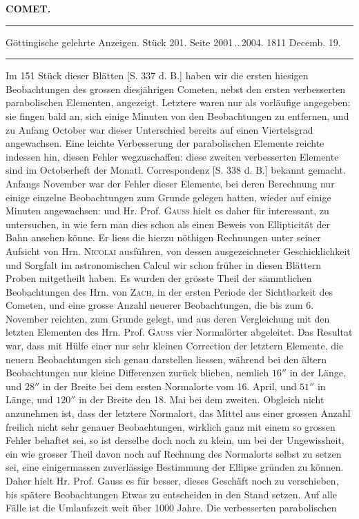 \clearpage{}\hypertarget{native-347-lower}{}\label{native-347-lower}
\begin{center}\textbf{COMET.}\par\vspace{4pt}\hrule\vspace{4pt}\fontsize{10}{12}\selectfont Göttingische gelehrte Anzeigen. Stück 201. Seite 2001\,..\,2004. 1811 Decemb. 19.\par\vspace{4pt}\hrule\vspace{4pt}\end{center}

\par\indent Im 151 Stück dieser Blätten [S. 337 d. B.] haben wir die ersten hiesigen Beobachtungen des grossen diesjährigen Cometen, nebst den ersten verbesserten parabolischen Elementen, angezeigt. Letztere waren nur als vorläufige angegeben; sie fingen bald an, sich einige Minuten von den Beobachtungen zu entfernen, und zu Anfang October war dieser Unterschied bereits auf einen Viertelsgrad angewachsen. Eine leichte Verbesserung der parabolischen Elemente reichte indessen hin, diesen Fehler wegzuschaffen: diese zweiten verbesserten Elemente sind im Octoberheft der Monatl. Correspondenz [S. 338 d. B.] bekannt gemacht. Anfangs November war der Fehler dieser Elemente, bei deren Berechnung nur einige einzelne Beobachtungen zum Grunde gelegen hatten, wieder auf einige Minuten angewachsen: und Hr. Prof. \textsc{Gauss} hielt es daher für interessant, zu untersuchen, in wie fern man dies schon als einen Beweis von Ellipticität der Bahn ansehen könne. Er liess die hierzu nöthigen Rechnungen unter seiner Aufsicht von Hrn. \textsc{Nicolai} ausführen, von dessen ausgezeichneter Geschicklichkeit und Sorgfalt im astronomischen Calcul wir schon früher in diesen Blättern Proben mitgetheilt haben. Es wurden der grösste Theil der sämmtlichen Beobachtungen des Hrn. von \textsc{Zach}, in der ersten Periode der Sichtbarkeit des Cometen, und eine grosse Anzahl neuerer Beobachtungen, die bis zum 6. November reichten, zum Grunde gelegt, und aus deren Vergleichung mit den letzten Elementen des Hrn. Prof. \textsc{Gauss} vier Normalörter abgeleitet. Das Resultat war, dass mit Hülfe einer nur sehr kleinen Correction der letztern Elemente, die neuern Beobachtungen sich genau darstellen liessen, während bei den ältern Beobachtungen nur kleine Differenzen zurück blieben, nemlich $16''$ in der Länge, und $28''$ in der Breite bei dem ersten Normalorte vom 16. April, und $51''$ in Länge, und $120''$ in der Breite den 18. Mai bei dem zweiten. Obgleich nicht anzunehmen ist, dass der letztere Normalort, das Mittel aus einer grossen Anzahl freilich nicht sehr genauer Beobachtungen, wirklich ganz mit einem so grossen Fehler behaftet sei, so ist derselbe doch noch zu klein, um bei der Ungewissheit, ein wie grosser Theil davon noch auf Rechnung des Normalorts selbst zu setzen sei, eine einigermassen zuverlässige Bestimmung der Ellipse gründen zu können. Daher hielt Hr. Prof. Gauss es für besser, dieses Geschäft noch zu verschieben, bis spätere Beobachtungen Etwas zu entscheiden in den Stand setzen. Auf alle Fälle ist die Umlaufszeit weit über 1000 Jahre. Die verbesserten parabolischen 